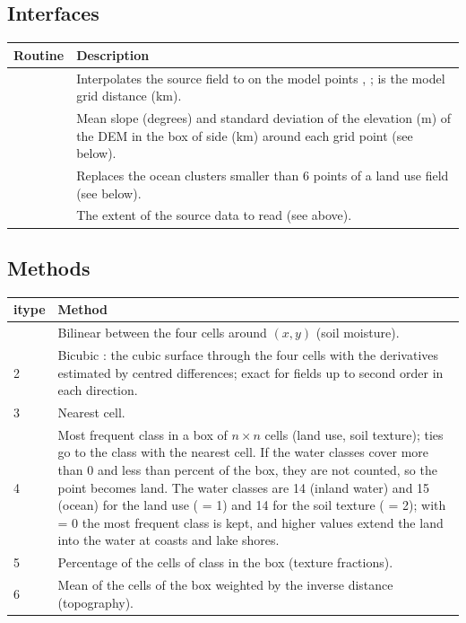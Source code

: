 \subsection{Interfaces}

\begin{longtable}{L{6cm} L{8cm}}
  \toprule
  \textbf{Routine} & \textbf{Description} \\
  \midrule
  \endhead
  \bottomrule
  \endfoot
   &
    Interpolates the source field  to  on the model
    points , ;  is the model grid distance
    (km). \\
   &
    Mean slope (degrees) and standard deviation of the elevation (m) of
    the DEM  in the box of side  (km) around each grid
    point (see below). \\
   &
    Replaces the ocean clusters smaller than 6 points of a land use field
    (see below). \\
   &
    The extent of the source data to read (see above). \\
\end{longtable}

\subsection{Methods}

\begin{longtable}{L{1.2cm} L{12.8cm}}
  \toprule
  \textbf{itype} & \textbf{Method} \\
  \midrule
  \endhead
  \bottomrule
   & Bilinear between the four cells around $(x,y)$ (soil moisture). \\
  2 & Bicubic \citep[Section 3.6]{press1992}: the cubic surface through the
      four cells with the derivatives estimated by centred differences;
      exact for fields up to second order in each direction. \\
  3 & Nearest cell. \\
  4 & Most frequent class in a box of $n\times n$ cells (land use, soil
      texture); ties go to the class with the nearest cell. If the water
      classes cover more than 0 and less than  percent of the
      box, they are not counted, so the point becomes land. The water
      classes are 14 (inland water) and 15 (ocean) for the land use
      ( = 1) and 14 for the soil texture ( = 2);
      with  = 0 the most frequent class is kept, and higher
      values extend the land into the water at coasts and lake shores. \\
  5 & Percentage of the cells of class  in the box (texture
      fractions). \\
  6 & Mean of the cells of the box weighted by the inverse distance
      (topography). \\
\end{longtable}

